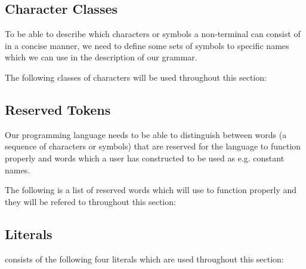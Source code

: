 \subsection{Character Classes}
To be able to describe which characters or symbols a non-terminal can consist of in a concise manner, we need to define some sets of symbols to specific names which we can use in the description of our grammar.

The following classes of characters will be used throughout this section:

\begin{ebnf}
\end{ebnf}

\subsection{Reserved Tokens}
Our programming language needs to be able to distinguish between words (a sequence of characters or symbols) that are reserved for the language to function properly and words which a user has constructed to be used as e.g. constant names.

The following is a list of reserved words which \productname{} will use to function properly and they will be refered to throughout this section:

\begin{ebnf}
\end{ebnf}

\subsection{Literals}
\productname{} consists of the following four literals which are used throughout this section:

